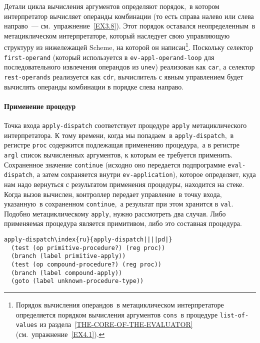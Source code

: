 Детали цикла вычисления аргументов определяют 
порядок,~в котором интерпретатор вычисляет операнды комбинации (то есть справа
налево или слева направо~--- см.~упражнение~\ref{EX3.8}).
Этот порядок оставался неопределенным~в метациклическом
интерпретаторе, который наследует свою управляющую структуру из
нижележащей Scheme, на которой он написан\footnote{Порядок вычисления операндов~в метациклическом
интерпретаторе определяется порядком вычисления аргументов
{\tt cons}~в процедуре {\tt list-of-values} из 
раздела~\ref{THE-CORE-OF-THE-EVALUATOR} 
(см.~упражнение~\ref{EX4.1}).
}.
Поскольку селектор {\tt first-operand} (который используется в
{\tt ev-appl-operand-loop} для последовательного извлечения
операндов из {\tt unev}) реализован как {\tt car}, а
селектор {\tt rest-operands} реализуется как {\tt cdr},
вычислитель с явным управлением будет вычислять операнды комбинации в
порядке слева направо.

\paragraph{Применение процедур}


Точка входа {\tt apply-dispatch} соответствует
процедуре {\tt apply} метациклического интерпретатора.  К тому
времени, когда мы попадаем~в {\tt apply-dispatch},~в регистре
{\tt proc} содержится подлежащая применению процедура,~а в
регистре {\tt argl} список вычисленных аргументов, к которым ее
требуется применить.  Сохраненное значение {\tt continue}
(исходно оно передается подпрограмме {\tt eval-dispatch}, а
затем сохраняется внутри {\tt ev-application}), которое
определяет, куда нам надо вернуться с результатом применения
процедуры, находится на стеке.  Когда вызов вычислен, контроллер
передает управление~в точку входа, указанную~в сохраненном
{\tt continue},~а результат при этом хранится в
{\tt val}.  Подобно метациклическому {\tt apply}, нужно
рассмотреть два случая.  Либо применяемая процедура является
примитивом, либо это составная процедура.

\begin{Verbatim}[fontsize=\small]
apply-dispatch\index{ru}{apply-dispatch||||pd|}
  (test (op primitive-procedure?) (reg proc))
  (branch (label primitive-apply))
  (test (op compound-procedure?) (reg proc))  
  (branch (label compound-apply))
  (goto (label unknown-procedure-type))
\end{Verbatim}

